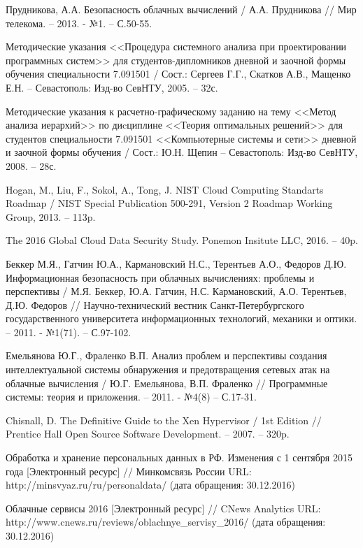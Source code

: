 \begingroup 
\renewcommand{\section}[2]{\anonsection{Библиографический список}}
\begin{thebibliography}{00}

    Прудникова, А.А.
    Безопасность облачных вычислений /
    А.А. Прудникова //
    Мир телекома. -- 2013. - №1.
    -- С.50-55.

    Методические указания <<Процедура системного анализа при проектировании программных систем>>
    для студентов-дипломников дневной и заочной формы обучения специальности 7.091501 /
    Сост.: Сергеев Г.Г., Скатков А.В., Мащенко Е.Н. -- Севастополь:
    Изд-во СевНТУ, 2005. -- 32с.

    Методические указания к расчетно-графическому заданию
    на тему <<Метод анализа иерархий>>  по диcциплине <<Теория оптимальных решений>>
    для студентов специальности 7.091501 <<Компьютерные системы и сети>>
    дневной и заочной формы обучения /
    Сост.: Ю.Н. Щепин -- Севастополь:
    Изд-во СевНТУ, 2008. -- 28с.

    Hogan, M., Liu, F., Sokol, A., Tong, J.
    NIST Cloud Computing Standarts Roadmap /
    NIST Special Publication 500-291, Version 2
    Roadmap Working Group, 2013. -- 113p.

    The 2016 Global Cloud Data Security Study.
    Ponemon Insitute LLC, 2016. -- 40p.

    Беккер М.Я., Гатчин Ю.А., Кармановский Н.С., Терентьев А.О., Федоров Д.Ю.
    Информационная безопасность при облачных вычислениях: проблемы и перспективы /
    М.Я. Беккер, Ю.А. Гатчин, Н.С. Кармановский, А.О. Терентьев, Д.Ю. Федоров //
    Научно-технический вестник Санкт-Петербургского государственного университета информационных технологий, механики и оптики. -- 2011. - №1(71).
    -- С.97-102.

    Емельянова Ю.Г., Фраленко В.П.
    Анализ проблем и перспективы создания интеллектуальной системы обнаружения и предотвращения сетевых атак на облачные вычисления /
    Ю.Г. Емельянова, В.П. Фраленко //
    Программные системы: теория и приложения. -- 2011. - №4(8)
    -- С.17-31.

    Chisnall, D.
    The Definitive Guide to the Xen Hypervisor /
    1st Edition //
    Prentice Hall Open Source Software Development. -- 2007. -- 320p.

    Обработка и хранение персональных данных в РФ. Изменения с 1 сентября 2015 года
    [Электронный ресурс] //
    Минкомсвязь России
    URL: http://minsvyaz.ru/ru/personaldata/
    (дата обращения: 30.12.2016)

    Облачные сервисы 2016
    [Электронный ресурс] //
    CNews Analytics
    URL: http://www.cnews.ru/reviews/oblachnye\_servisy\_2016/
    (дата обращения: 30.12.2016)

\end{thebibliography}
\endgroup

\clearpage
